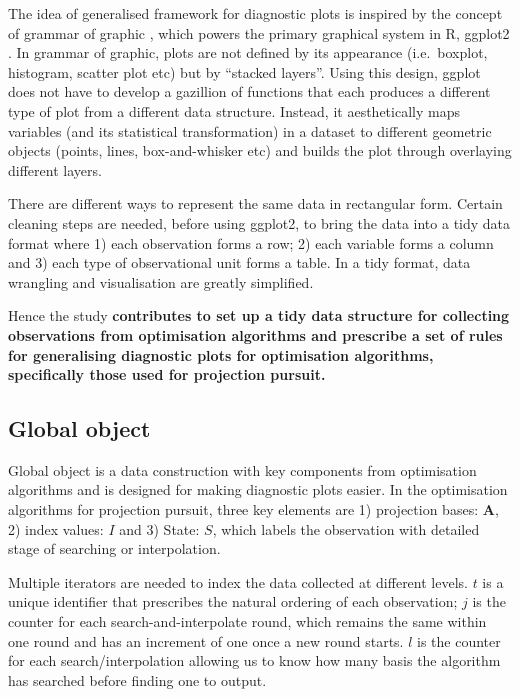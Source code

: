 \documentclass[12pt]{article}
\begin{document}
The idea of generalised framework for diagnostic plots is inspired by
the concept of grammar of graphic \citep{wickham2010layered}, which
powers the primary graphical system in R, ggplot2 \citep{ggplot2}. In
grammar of graphic, plots are not defined by its appearance
(i.e.~boxplot, histogram, scatter plot etc) but by ``stacked layers''.
Using this design, ggplot does not have to develop a gazillion of
functions that each produces a different type of plot from a different
data structure. Instead, it aesthetically maps variables (and its
statistical transformation) in a dataset to different geometric objects
(points, lines, box-and-whisker etc) and builds the plot through
overlaying different layers.

There are different ways to represent the same data in rectangular form.
Certain cleaning steps are needed, before using ggplot2, to bring the
data into a tidy data format \citep{wickham2014tidy} where 1) each
observation forms a row; 2) each variable forms a column and 3) each
type of observational unit forms a table. In a tidy format, data
wrangling and visualisation are greatly simplified.

Hence the study \textbf{contributes to set up a tidy data structure for
collecting observations from optimisation algorithms and prescribe a set
of rules for generalising diagnostic plots for optimisation algorithms,
specifically those used for projection pursuit.}

\hypertarget{global-object}{%
\subsection{Global object}\label{global-object}}

Global object is a data construction with key components from
optimisation algorithms and is designed for making diagnostic plots
easier. In the optimisation algorithms for projection pursuit, three key
elements are 1) projection bases: \(\mathbf{A}\), 2) index values: \(I\)
and 3) State: \(S\), which labels the observation with detailed stage of
searching or interpolation.

Multiple iterators are needed to index the data collected at different
levels. \(t\) is a unique identifier that prescribes the natural
ordering of each observation; \(j\) is the counter for each
search-and-interpolate round, which remains the same within one round
and has an increment of one once a new round starts. \(l\) is the
counter for each search/interpolation allowing us to know how many basis
the algorithm has searched before finding one to output.
\end{document}
